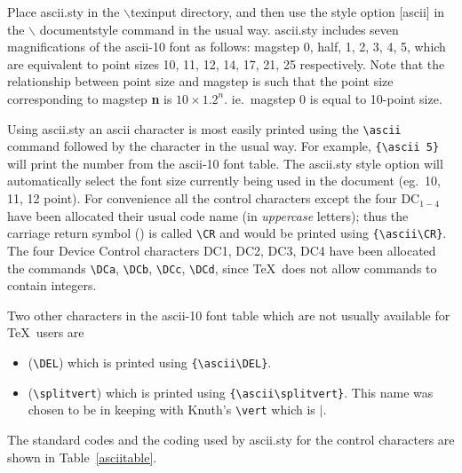 Place {\sc ascii.sty} in the {$\backslash$}{\sc texinput} directory,
and then use  the style option [{\sc ascii}] in the {$\backslash$}%
documentstyle command in the usual way.
{\sc ascii.sty} includes seven magnifications  of the {\sc ascii-10} font
as follows: magstep 0, half, 1, 2, 3, 4, 5, which are equivalent to point
sizes 10, 11, 12, 14, 17, 21, 25 respectively.
Note that the relationship between point size and magstep is such that
the point size corresponding to magstep {\bf n} is
$10 \times {1.2}^n$. ie.\ magstep 0 is equal to 10-point size.

Using {\sc ascii.sty}  an {\sc ascii}  character  is most easily
printed using the \verb#\ascii# command followed by the character
in the usual way. For example, \verb!{\ascii 5}! will print  the
number  {} from the {\sc ascii-10} font table.
The {\sc ascii.sty} style option will  automatically select the font size
currently being used in the document (eg.\ 10, 11, 12 point).
For convenience all the control characters except the four DC$_{1-4}$ have
been allocated  their usual code name (in {\it uppercase\/} letters);
thus the carriage return symbol ({\ascii\CR})
is called \verb#\CR#  and would be printed using \verb#{\ascii\CR}#.
The four Device Control characters DC1, DC2, DC3, DC4  have been 
allocated the commands \verb!\DCa!, \verb!\DCb!, \verb!\DCc!, \verb!\DCd!,
since \TeX\ does not allow commands to contain integers.

Two other characters in the {\sc ascii-10} font table which are not
usually available for \TeX\ users are
\begin{itemize}
\item {\ascii\DEL} (\verb!\DEL!) which is printed using
       \verb!{\ascii\DEL}!.
\item {\ascii \splitvert} (\verb!\splitvert!) which is printed using
      \verb!{\ascii\splitvert}!.
This name was chosen to be in keeping with Knuth's \verb!\vert! which is
$\vert$.
\end{itemize}

The standard codes and the coding  used by {\sc ascii.sty} for the control
 characters are shown in Table~\ref{asciitable}.


